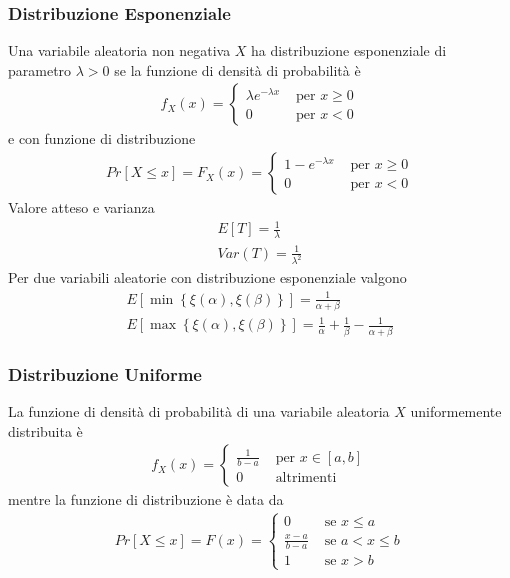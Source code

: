 \documentclass{article}
\begin{document}
\subsubsection{Distribuzione Esponenziale}
Una variabile aleatoria non negativa $X$ ha distribuzione esponenziale di parametro $\lambda >0$ se la funzione di densità di probabilità è
\begin{align*}
f_X(x) = \begin{cases}
\lambda e^{-\lambda x} 	& \text{ per } x \ge 0\\
0 						& \text{ per } x < 0
\end{cases}
\end{align*}
e con funzione di distribuzione
\begin{align*}
Pr[X \le x] = F_X(x) = \begin{cases}
1 - e^{-\lambda x} 	& \text{ per } x \ge 0\\
0 					& \text{ per } x < 0
\end{cases}
\end{align*}
Valore atteso e varianza
\begin{gather*}
E[T] = \frac{1}{\lambda}\\
Var(T) = \frac{1}{\lambda^2}
\end{gather*}
Per due variabili aleatorie con distribuzione esponenziale valgono
\begin{gather*}
E[\min\left\{\xi(\alpha),\xi(\beta)\right\}] = \frac{1}{\alpha + \beta}\\
E[\max\left\{\xi(\alpha),\xi(\beta)\right\}] = \frac{1}{\alpha} + \frac{1}{\beta} - \frac{1}{\alpha + \beta}
\end{gather*}

\subsubsection{Distribuzione Uniforme}
La funzione di densità di probabilità di una variabile aleatoria $X$ uniformemente distribuita è
\begin{align*}
f_X(x) = \begin{cases}
\frac{1}{b-a} 	& \text{ per } x \in [a,b]\\
0 				& \text{ altrimenti }
\end{cases} 
\end{align*}
mentre la funzione di distribuzione è data da
\begin{align*}
Pr[X \le x] = F(x) = \begin{cases}
0 					& \text{ se } x \le a\\
\frac{x - a}{b - a} 	& \text{ se } a < x \le b\\
1 					& \text{ se } x > b
\end{cases}
\end{align*}
\end{document}
